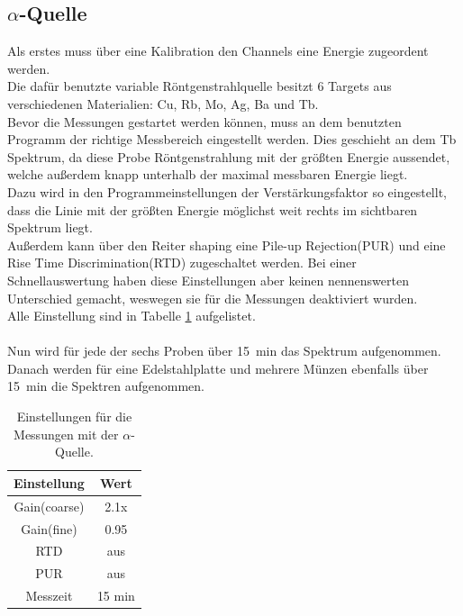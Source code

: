 \documentclass[12pt,a4paper]{article}
\begin{document}
\subsection{$\alpha$-Quelle}
Als erstes muss über eine Kalibration den Channels eine Energie zugeordent werden.\\
Die dafür benutzte variable Röntgenstrahlquelle besitzt 6 Targets aus verschiedenen Materialien: Cu, Rb, Mo, Ag, Ba und Tb.\\
Bevor die Messungen gestartet werden können, muss an dem benutzten Programm der richtige Messbereich eingestellt werden. Dies geschieht an dem Tb Spektrum, da diese Probe Röntgenstrahlung mit der größten Energie aussendet, welche außerdem knapp unterhalb der maximal messbaren Energie liegt.\\
Dazu wird in den Programmeinstellungen der Verstärkungsfaktor so eingestellt, dass die Linie mit der größten Energie möglichst weit rechts im sichtbaren Spektrum liegt.\\
Außerdem kann über den Reiter shaping eine Pile-up Rejection(PUR) und eine Rise Time Discrimination(RTD) zugeschaltet werden. Bei einer Schnellauswertung haben diese Einstellungen aber keinen nennenswerten Unterschied gemacht, weswegen sie für die Messungen deaktiviert wurden.\\
Alle Einstellung sind in Tabelle \ref{tab:alpha_Einstellungen} aufgelistet.\\
\\
Nun wird für jede der sechs Proben über \SI{15}{min} das Spektrum aufgenommen.\\
Danach werden für eine Edelstahlplatte und mehrere Münzen ebenfalls über \SI{15}{min} die Spektren aufgenommen.
\begin{table}
\centering
\begin{tabular}{|c|c|}
\hline 
Einstellung & Wert \\ 
\hline 
Gain(coarse) & 2.1x \\ 
\hline 
Gain(fine) & 0.95 \\ 
\hline 
RTD & aus \\ 
\hline 
PUR & aus \\ 
\hline 
Messzeit & 15 min \\ 
\hline 
\end{tabular} 
\caption{Einstellungen für die Messungen mit der $\alpha$-Quelle.}
\label{tab:alpha_Einstellungen}
\end{table}
\end{document}
